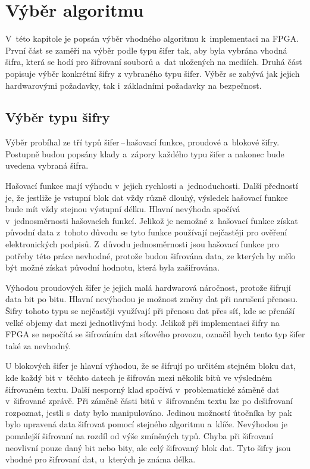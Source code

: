 \chapter{Výběr algoritmu}
V~této kapitole je popsán výběr vhodného algoritmu k~implementaci na FPGA. První část se zaměří na výběr podle typu šifer tak, aby byla vybrána vhodná šifra, která se hodí pro šifrovaní souborů a~dat uložených na mediích. Druhá část popisuje výběr konkrétní šifry z vybraného typu šifer. Výběr se zabývá jak jejich hardwarovými požadavky, tak i~základními požadavky na bezpečnost.

\section{Výběr typu šifry}
Výběr probíhal ze tří typů šifer\,--\,hašovací funkce, proudové a~blokové šifry. Postupně budou popsány klady a~zápory každého typu šifer a nakonec bude uvedena vybraná šifra.

Hašovací funkce mají výhodu v~jejich rychlosti a~jednoduchosti. Další předností je, že jestliže je vstupní blok dat vždy různě dlouhý, výsledek hašovací funkce bude mít vždy stejnou výstupní délku. Hlavní nevýhoda spočívá v~jednosměrnosti hašovacích funkcí. Jelikož je nemožné z~hašovací funkce získat původní data z~tohoto důvodu se tyto funkce používají nejčastěji pro ověření elektronických podpisů. Z~důvodu jednosměrnosti jsou hašovací funkce pro potřeby této práce nevhodné, protože budou šifrována data, ze kterých by mělo být možné získat původní hodnotu, která byla zašifrována.

Výhodou proudových šifer je jejich malá hardwarová náročnost, protože šifrují data bit po bitu. Hlavní nevýhodou je možnost změny dat při narušení přenosu. Šifry tohoto typu se nejčastěji využívají při přenosu dat přes síť, kde se přenáší velké objemy dat mezi jednotlivými body. Jelikož při implementaci šifry na FPGA se nepočítá se šifrováním dat síťového provozu, označil bych tento typ šifer také za nevhodný.

U blokových šifer je hlavní výhodou, že se šifrují po určitém stejném bloku dat, kde každý bit v~těchto datech je šifrován mezi několik bitů ve výsledném šifrovaném textu. Další nesporný klad spočívá v~problematické záměně dat v~šifrované zprávě. Při záměně části bitů v~šifrovaném textu lze po dešifrovaní rozpoznat, jestli s~daty bylo manipulováno. Jedinou možností útočníka by pak bylo upravená data šifrovat pomocí stejného algoritmu a~klíče. Nevýhodou je pomalejší šifrovaní na rozdíl od výše zmíněných typů. Chyba při šifrovaní neovlivní pouze daný bit nebo bity, ale celý šifrovaný blok dat. Tyto šifry jsou vhodné pro šifrovaní dat, u~kterých je známa délka.

